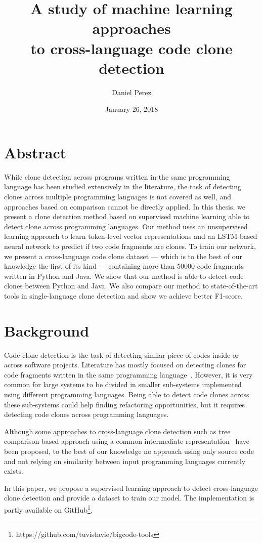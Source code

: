 \documentclass[11pt,a4paper,twocolumn]{article}
\title{A study of machine learning approaches\\to cross-language code clone detection}
\date{January 26, 2018}
\author{Daniel Perez}
\begin{document}
\maketitle
\section*{Abstract}
While clone detection across programs written in the same programming language
has been studied extensively in the literature, the task of detecting clones
across multiple programming languages is not covered as well, and approaches
based on comparison cannot be directly applied.
In this thesis, we present a clone detection method based on supervised
machine learning able to detect clone across programming languages.
Our method uses an unsupervised learning approach to learn token-level vector
representations and an LSTM-based neural network to predict if two code
fragments are clones. To train our network, we present a cross-language code
clone dataset --- which is to the best of our knowledge the first of its kind
--- containing more than 50000 code fragments written in Python and Java.
We show that our method is able to detect code clones between Python and Java.
We also compare our method to state-of-the-art tools in single-language clone
detection and show we achieve better F1-score.
\section{Background}
Code clone detection is the task of detecting similar piece of codes inside or
across software projects. Literature has mostly focused on detecting
clones for code fragments written in the same programming
language~\cite{Roy07asurvey}.
However, it is very common for large systems to be divided in
smaller sub-systems implemented using different programming languages. Being
able to detect code clones across these sub-systems could help finding
refactoring opportunities, but it requires detecting code clones across
programming languages.

Although some approaches to cross-language clone detection such as
tree comparison based approach using a common intermediate
representation~\cite{DBLP:conf/seke/KraftBS08} have been proposed, to the best
of our knowledge no approach using only source code and not relying on
similarity between input programming languages currently exists.

In this paper, we propose a supervised learning approach to detect
cross-language clone detection and provide a dataset to train our model.
The implementation is partly available on GitHub\footnote{https://github.com/tuvistavie/bigcode-tools}.
\end{document}
